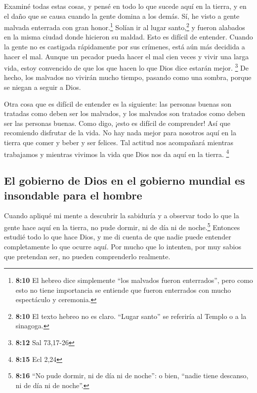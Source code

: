  Examiné todas estas cosas, y pensé en todo lo que sucede
aquí en la tierra, y en el daño que se causa cuando la gente domina a
los demás.  Sí, he visto a gente malvada enterrada con
gran honor.\footnote{\textbf{8:10} El hebreo dice simplemente ``los
  malvados fueron enterrados'', pero como esto no tiene importancia se
  entiende que fueron enterrados con mucho espectáculo y ceremonia.}
Solían ir al lugar santo,\footnote{\textbf{8:10} El texto hebreo no es
  claro. ``Lugar santo'' se referiría al Templo o a la sinagoga.} y
fueron alabados en la misma ciudad donde hicieron su maldad. Esto es
difícil de entender.  Cuando la gente no es castigada
rápidamente por sus crímenes, está aún más decidida a hacer el mal.
 Aunque un pecador pueda hacer el mal cien veces y vivir
una larga vida, estoy convencido de que los que hacen lo que Dios dice
estarán mejor. \footnote{\textbf{8:12} Sal 73,17-26}  De
hecho, los malvados no vivirán mucho tiempo, pasando como una sombra,
porque se niegan a seguir a Dios.

 Otra cosa que es difícil de entender es la siguiente:
las personas buenas son tratadas como deben ser los malvados, y los
malvados son tratados como deben ser las personas buenas. Como digo,
¡esto es difícil de comprender!  Así que recomiendo
disfrutar de la vida. No hay nada mejor para nosotros aquí en la tierra
que comer y beber y ser felices. Tal actitud nos acompañará mientras
trabajamos y mientras vivimos la vida que Dios nos da aquí en la tierra.
\footnote{\textbf{8:15} Ecl 2,24}

\hypertarget{el-gobierno-de-dios-en-el-gobierno-mundial-es-insondable-para-el-hombre}{%
\subsection{El gobierno de Dios en el gobierno mundial es insondable
para el
hombre}\label{el-gobierno-de-dios-en-el-gobierno-mundial-es-insondable-para-el-hombre}}

 Cuando apliqué mi mente a descubrir la sabiduría y a
observar todo lo que la gente hace aquí en la tierra, no pude dormir, ni
de día ni de noche.\footnote{\textbf{8:16} ``No pude dormir, ni de día
  ni de noche'': o bien, ``nadie tiene descanso, ni de día ni de
  noche''.}  Entonces estudié todo lo que hace Dios, y me
di cuenta de que nadie puede entender completamente lo que ocurre aquí.
Por mucho que lo intenten, por muy sabios que pretendan ser, no pueden
comprenderlo realmente.

